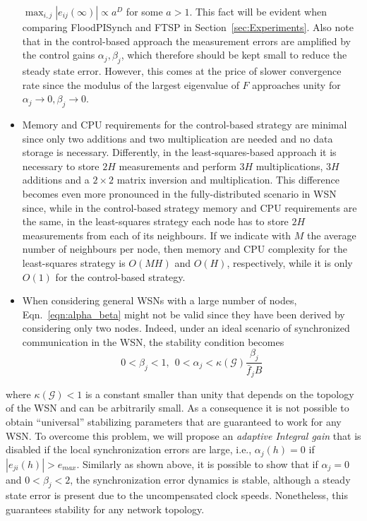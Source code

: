 \documentclass[english,a4paper,10pt,final]{article}
\numberwithin{equation}{section}
\numberwithin{figure}{section}
\begin{document}
\begin{itemize}
$\max_{i,j}|e_{ij}(\infty)| \propto a^D$ for some $a>1$. This fact will be evident when comparing FloodPISynch and FTSP in Section~\ref{sec:Experiments}. Also note that in the control-based approach the measurement errors are amplified by the control gains $\alpha_j,\beta_j$, which therefore should be kept small to reduce the steady state error. However, this comes at the price of slower convergence rate since the modulus of the largest eigenvalue of $F$ approaches unity for $\alpha_j\to 0,\beta_j\to 0$.

\item Memory and CPU requirements for the control-based strategy are minimal since only two additions and two multiplication are needed and no data storage is necessary. Differently, in the least-squares-based approach it is necessary to store $2H$ measurements and perform $3H$ multiplications, $3H$ additions and a $2\times 2$ matrix inversion and multiplication. This difference becomes even more pronounced in the fully-distributed scenario in WSN since, while in the control-based strategy memory and CPU requirements are the same, in the least-squares strategy each node has to store $2H$ measurements from each of its neighbours. If we indicate with $M$ the average number of neighbours per node, then memory and CPU complexity for the least-squares strategy is $O(MH)$ and $O(H)$, respectively, while it is only $O(1)$ for the control-based strategy. 

\item When considering general WSNs with a large number of nodes, Eqn.~\eqref{eqn:alpha_beta} might not be valid since they have been derived by considering only two nodes. Indeed, under an ideal scenario of synchronized communication in the WSN, the stability condition becomes
$$ 0<\beta_j<1, \ \  0<\alpha_j< \kappa(\mathcal{G})\frac{\beta_j}{\bar f_j B} $$
\end{itemize} 
where $\kappa(\mathcal{G})<1$ is a constant smaller than unity that depends on the topology of the WSN and can be arbitrarily small. As a consequence it is not possible to obtain ``universal'' stabilizing parameters that are guaranteed to work for any WSN. To overcome this problem, we will propose an \emph{adaptive Integral gain} that is disabled if the local synchronization errors are large, i.e., $\alpha_j(h)=0$ if $|e_{ji}(h)|>e_{max}$. Similarly as shown above, it is possible to show that if $\alpha_j=0$ and $0<\beta_j<2$, the synchronization error dynamics is stable, although a steady state error is present due to the uncompensated clock speeds. Nonetheless, this guarantees stability for any network topology.   
\end{document}
